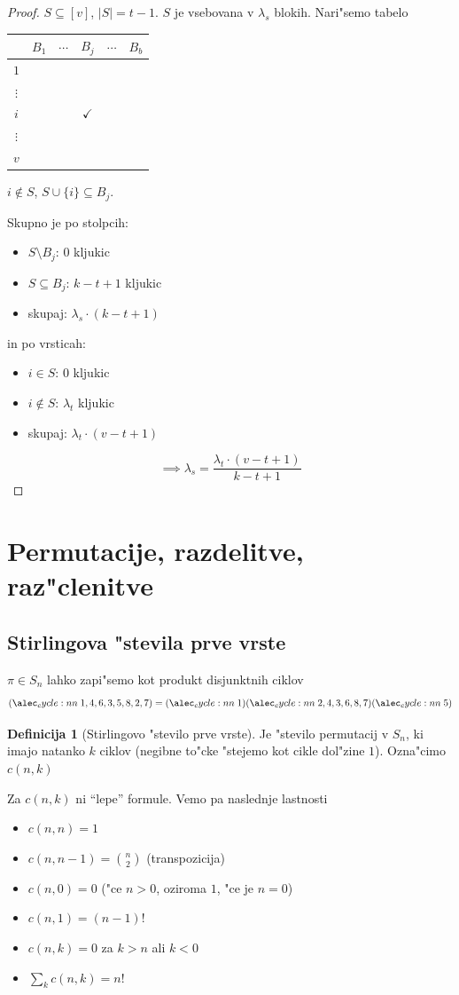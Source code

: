 \documentclass[a4paper,12pt]{article}
\theoremstyle{definition}
\newtheorem{defn}[counter]{Definicija}
\theoremstyle{remark}
\begin{document}
\begin{proof}
	$S \subseteq [v]$, $|S| = t - 1$. $S$ je vsebovana v $\lambda_s$ blokih.
	Nari"semo tabelo
	\begin{center}
		\begin{tabular}{c|c c c c c}
		     & $B_1$ & $\cdots$ & $B_j$ & $\cdots$ & $B_b$ \\
		\hline
		     $1$ \\
		     $\vdots$ \\
		     $i$ & & & $\checkmark$ \\
		     $\vdots$ \\
		     $v$
		\end{tabular}
	\end{center}
	$i \notin S$, $S \cup \{i\} \subseteq B_j$.
	
	Skupno je po stolpcih:
	\begin{itemize}
	    \item $S\setminus B_j$: $0$ kljukic
	    \item $S \subseteq B_j$: $k-t+1$ kljukic
	    \item[] skupaj: $\lambda_s\cdot(k-t+1)$
	\end{itemize}
	in po vrsticah:
	\begin{itemize}
	    \item $i\in S$: $0$ kljukic
	    \item $i\notin S$: $\lambda_t$ kljukic
	    \item[] skupaj: $\lambda_t\cdot(v-t+1)$
	\end{itemize}
	\[\implies \lambda_s = \frac{\lambda_t\cdot(v - t + 1)}{k-t+1}\]
\end{proof}


\section{Permutacije, razdelitve, raz"clenitve}
\subsection{Stirlingova "stevila prve vrste}
$\pi \in S_n$ lahko zapi"semo kot produkt disjunktnih ciklov
\[\cycle{1, 4, 6, 3, 5, 8, 2, 7} = \cycle{1}\cycle{2, 4, 3, 6, 8, 7}\cycle{5}\]

\begin{defn}[Stirlingovo "stevilo prve vrste]
	Je "stevilo permutacij v $S_n$, ki imajo natanko $k$ ciklov (negibne to"cke "stejemo kot cikle dol"zine $1$). Ozna"cimo $c(n, k)$
\end{defn}
Za $c(n, k)$ ni ``lepe'' formule. Vemo pa naslednje lastnosti
\begin{itemize}
	\item $c(n, n) = 1$
	\item $c (n, n-1) = \binom{n}{2}$ (transpozicija)
	\item $c(n, 0) = 0$ ("ce $n > 0$, oziroma $1$, "ce je $n = 0$)
	\item $c(n, 1) = (n-1)!$
	\item $c(n, k) = 0$ za $k > n$ ali $k < 0$
	\item $\sum_k c(n, k) = n!$
\end{itemize}
\end{document}
